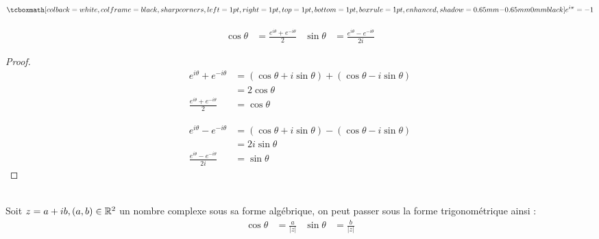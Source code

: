 \begin{propositionbox}
    \begin{proposition}
    \begin{align*}
        \boxshadow{e^{i \pi} = -1} 
    \end{align*}
\end{proposition}
\end{propositionbox}

\begin{propositionbox}
    \begin{proposition}
    \begin{align*}
        \cos{\theta} &= \frac{e^{i\theta} + e^{-i\theta}}{2} & \sin{\theta} &= \frac{e^{i\theta} - e^{-i\theta}}{2i}
    \end{align*}
\end{proposition}
\end{propositionbox}
\begin{proof}
        \begin{align*}
            e^{i\theta} + e^{-i\theta} &= (\cos{\theta} + i\sin{\theta}) + (\cos{\theta} - i\sin{\theta}) \\
                                       &= 2\cos{\theta} \\
        \frac{e^{i\theta} + e^{-i\theta}}{2} &= \cos{\theta}
        \end{align*}
        
        \begin{align*}
            e^{i\theta} - e^{-i\theta} &= (\cos{\theta} + i\sin{\theta}) - (\cos{\theta} - i\sin{\theta}) \\
                                       &= 2i\sin{\theta} \\
            \frac{e^{i\theta} - e^{-i\theta}}{2i} &= \sin{\theta} 
        \end{align*}
\end{proof}

\begin{leftstroke}
\begin{remarque}~ 
    \\
    Soit $z = a + ib, (a, b) \in \mathbb{R}^2$ un nombre complexe sous sa forme algébrique, on peut passer sous la forme trigonométrique ainsi :
    \begin{align*}
        \cos{\theta} &= \frac{a}{|z|} & \sin{\theta} &= \frac{b}{|z|}
    \end{align*}
    \end{remarque}
\end{leftstroke}

